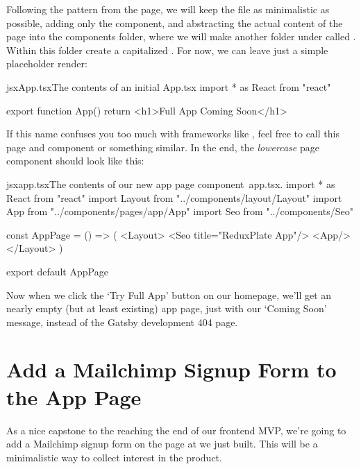 \documentclass[a4paper,headinclude=on,footinclude=on,12pt,oneside]{scrbook}
\begin{document}
Following the pattern from the  page, we will keep the  file as minimalistic as possible, adding only the  component, and abstracting the actual content of the page into the components folder, where we will make another folder under  called . Within this folder create a capitalized . For now, we can leave just a simple placeholder render:

\begin{codeInput}{jsx}{App.tsx}{The contents of an initial App.tsx}
import * as React from "react"

export function App() {
  return <h1>Full App Coming Soon</h1>
} 
\end{codeInput}

If this name  confuses you too much with frameworks like , feel free to call this page and component  or something similar. In the end, the \textit{lowercase} page component  should look like this:

\begin{codeInput}{jsx}{app.tsx}{The contents of our new app page component\, app.tsx.}
import * as React from "react"
import Layout from "../components/layout/Layout"
import { App } from "../components/pages/app/App"
import Seo from "../components/Seo"

const AppPage = () => (
  <Layout>
    <Seo title="ReduxPlate App"/>
    <App/>
  </Layout>
)

export default AppPage  
\end{codeInput}

Now when we click the `Try Full App' button on our homepage, we'll get an nearly empty (but at least existing) app page, just with our `Coming Soon' message, instead of the Gatsby development 404 page.

\section{Add a Mailchimp Signup Form to the App Page}

As a nice capstone to the reaching the end of our frontend MVP, we're going to add a Mailchimp signup form on the page at  we just built. This will be a minimalistic way to collect interest in the product. 
\end{document}
